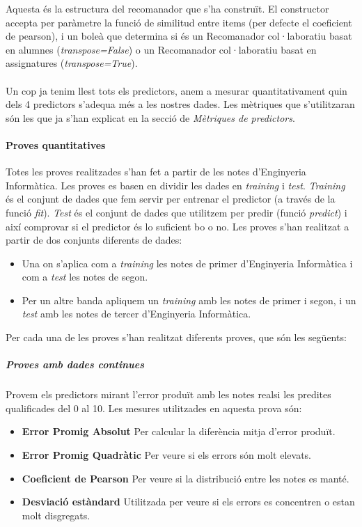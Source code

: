 \documentclass[12pt,a4paper,catalan]{article}
\begin{document}
Aquesta és la estructura del recomanador que s'ha construït. El constructor accepta per paràmetre la funció de similitud entre items (per defecte el coeficient de pearson), i un boleà que determina si és un Recomanador col·laboratiu basat en alumnes (\textit{transpose=False}) o un Recomanador col·laboratiu basat en assignatures (\textit{transpose=True}).
\\
\\
Un cop ja tenim llest tots els predictors, anem a mesurar quantitativament quin dels 4 predictors s'adequa més a les nostres dades. Les mètriques que s'utilitzaran són les que ja s'han explicat en la secció de \textit{Mètriques de predictors}.

\paragraph{Proves quantitatives}
Totes les proves realitzades s'han fet a partir de les notes d'Enginyeria Informàtica. Les proves es basen en dividir les dades en \textit{training} i \textit{test}. \textit{Training} és el conjunt de dades que fem servir per entrenar el predictor (a través de la funció \textit{fit}). \textit{Test} és el conjunt de dades que utilitzem per predir (funció \textit{predict}) i així comprovar si el predictor és lo suficient bo o no. Les proves s'han realitzat a partir de dos conjunts diferents de dades:

\begin{itemize}[leftmargin=.5in]
	\item Una on s'aplica com a \textit{training} les notes de primer d'Enginyeria Informàtica i com a \textit{test} les notes de segon.
	\item Per un altre banda apliquem un \textit{training} amb les notes de primer i segon, i un \textit{test} amb les notes de tercer d'Enginyeria Informàtica.
\end{itemize}

Per cada una de les proves s'han realitzat diferents proves, que són les següents:

\subparagraph{Proves amb dades continues}
Provem els predictors mirant l'error produït amb les notes realsi les predites qualificades del 0 al 10. Les mesures utilitzades en aquesta prova són:

\begin{itemize}[leftmargin=.5in]
	\item \textbf{Error Promig Absolut} Per calcular la diferència mitja d'error produït.
	\item \textbf{Error Promig Quadràtic} Per veure si els errors són molt elevats.
	\item \textbf{Coeficient de Pearson} Per veure si la distribució entre les notes es manté.
	\item \textbf{Desviació estàndard} Utilitzada per veure si els errors es concentren o estan molt disgregats.
\end{itemize}
\end{document}
